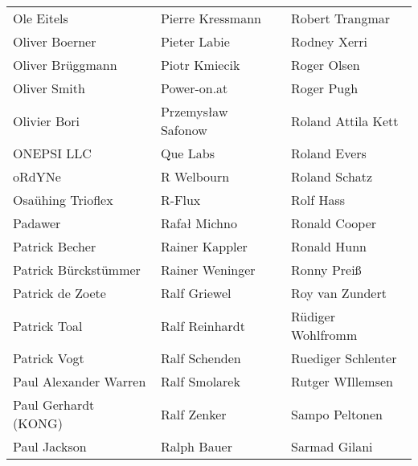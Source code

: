 \begin{tabular}{p{4.5cm}p{4.5cm}p{4.5cm}}
Ole Eitels & Pierre Kressmann & Robert Trangmar \\
Oliver Boerner & Pieter Labie & Rodney Xerri \\
Oliver Brüggmann & Piotr Kmiecik & Roger Olsen \\
Oliver Smith & Power-on.at & Roger Pugh \\
Olivier Bori & Przemysław Safonow & Roland Attila Kett \\
ONEPSI LLC & Que Labs & Roland Evers \\
oRdYNe & R Welbourn & Roland Schatz \\
Osaühing Trioflex & R-Flux & Rolf Hass \\
Padawer & Rafał Michno & Ronald Cooper \\
Patrick Becher & Rainer Kappler & Ronald Hunn \\
Patrick Bürckstümmer & Rainer Weninger & Ronny Preiß \\
Patrick de Zoete & Ralf Griewel & Roy van Zundert \\
Patrick Toal & Ralf Reinhardt & Rüdiger Wohlfromm \\
Patrick Vogt & Ralf Schenden & Ruediger Schlenter \\
Paul Alexander Warren & Ralf Smolarek & Rutger WIllemsen \\
Paul Gerhardt (KONG) & Ralf Zenker & Sampo Peltonen \\
Paul Jackson & Ralph Bauer & Sarmad Gilani \\
\end{tabular}
\newpage
\setlength{\tabcolsep}{1mm}
